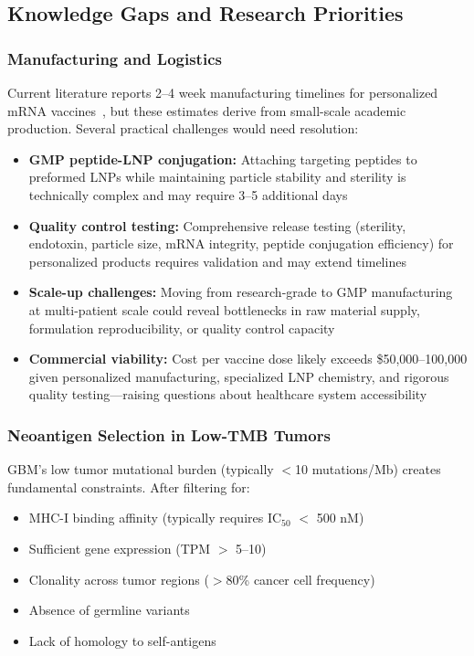 \documentclass[12pt]{article}
\begin{document}
\subsection{Knowledge Gaps and Research Priorities}

\subsubsection{Manufacturing and Logistics}
Current literature reports 2--4 week manufacturing timelines for personalized mRNA vaccines~\citep{wang2025,hilf2024}, but these estimates derive from small-scale academic production. Several practical challenges would need resolution:

\begin{itemize}[leftmargin=*,noitemsep]
\item \textbf{GMP peptide-LNP conjugation:} Attaching targeting peptides to preformed LNPs while maintaining particle stability and sterility is technically complex and may require 3--5 additional days
\item \textbf{Quality control testing:} Comprehensive release testing (sterility, endotoxin, particle size, mRNA integrity, peptide conjugation efficiency) for personalized products requires validation and may extend timelines
\item \textbf{Scale-up challenges:} Moving from research-grade to GMP manufacturing at multi-patient scale could reveal bottlenecks in raw material supply, formulation reproducibility, or quality control capacity
\item \textbf{Commercial viability:} Cost per vaccine dose likely exceeds \$50,000--100,000 given personalized manufacturing, specialized LNP chemistry, and rigorous quality testing—raising questions about healthcare system accessibility
\end{itemize}

\subsubsection{Neoantigen Selection in Low-TMB Tumors}
GBM's low tumor mutational burden (typically $<$10 mutations/Mb) creates fundamental constraints. After filtering for:
\begin{itemize}[leftmargin=*,noitemsep]
\item MHC-I binding affinity (typically requires IC$_{50}$ $<$ 500 nM)
\item Sufficient gene expression (TPM $>$ 5--10)
\item Clonality across tumor regions ($>$80\% cancer cell frequency)
\item Absence of germline variants
\item Lack of homology to self-antigens
\end{itemize}
\end{document}
